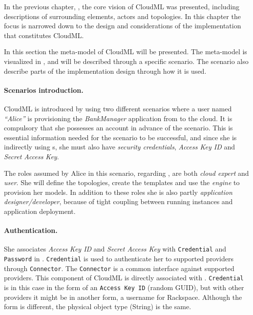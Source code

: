 
In the previous chapter, , the core vision of CloudML was presented,
including descriptions of surrounding elements, \eg actors and topologies.
In this chapter the focus is narrowed down to the design and considerations 
of the implementation that constitutes CloudML.



In this section the meta-model of CloudML will be presented.
The meta-model is visualized in ,
and will be described through a specific scenario.
The scenario also describe parts of the implementation design through how it is used.

\paragraph{Scenarios introduction.}

CloudML is introduced by using two different scenarios where a user named \emph{``Alice''} is provisioning the 
\emph{BankManager} application from  to the  cloud.
It is compulsory that she possesses an  account in advance of the scenario.
This is essential information needed for the scenario to be successful,
and since she is indirectly using  s,
she must also have \emph{security credentials},
\ie \emph{Access Key ID} and \emph{Secret Access Key}.

The roles assumed by Alice in this scenario, regarding ,
are both \emph{cloud expert} and \emph{user}.
She will define the topologies, create the templates and use 
the \emph{engine} to provision her models.
In addition to these roles she is also partly \emph{application designer/developer},
because of tight coupling between running instances and application deployment.

\paragraph{Authentication.}

She associates \emph{Access Key ID} and \emph{Secret Access Key} with 
\texttt{Credential} and \texttt{Password} in .
\texttt{Credential} is used to authenticate her to supported providers through \texttt{Connector}.
The \texttt{Connector} is a common interface against supported providers.
This component of CloudML is directly associated with .
\texttt{Credential} is in this case in the form of an \texttt{Access Key ID} (random GUID),
but with other providers it might be in another form, \eg a username for Rackspace.
Although the form is different, the physical object type (String) is the same.

